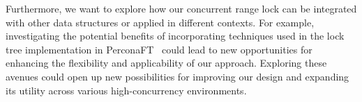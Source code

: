 Furthermore, we want to explore how our concurrent range lock can be integrated with other data structures or applied in different contexts. For example, investigating the potential benefits of incorporating techniques used in the lock tree implementation in PerconaFT~\parencite{perconaft} could lead to new opportunities for enhancing the flexibility and applicability of our approach. Exploring these avenues could open up new possibilities for improving our design and expanding its utility across various high-concurrency environments.